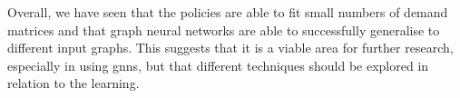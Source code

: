Overall, we have seen that the policies are able to fit small numbers of demand matrices and that graph neural networks are able to successfully generalise to different input graphs. This suggests that it is a viable area for further research, especially in using \acp{gnn}, but that different techniques should be explored in relation to the learning.

